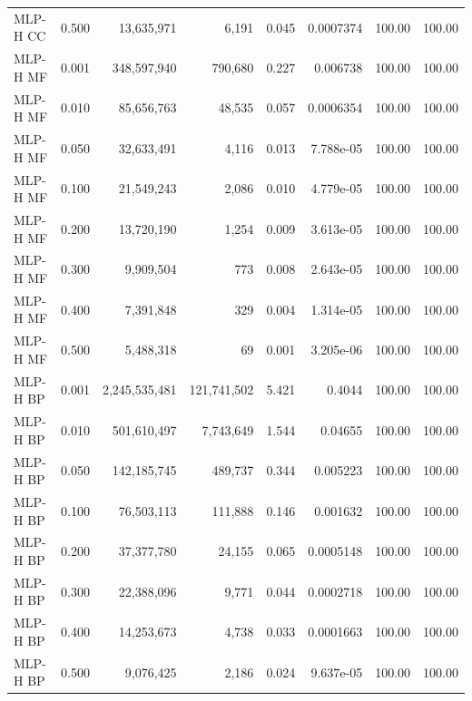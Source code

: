 \begin{longtable}{lrrrrrrr}
MLP-H CC & 0.500 & 13,635,971 & 6,191 & 0.045 & 0.0007374 & 100.00 & 100.00 \\
MLP-H MF & 0.001 & 348,597,940 & 790,680 & 0.227 & 0.006738 & 100.00 & 100.00 \\
MLP-H MF & 0.010 & 85,656,763 & 48,535 & 0.057 & 0.0006354 & 100.00 & 100.00 \\
MLP-H MF & 0.050 & 32,633,491 & 4,116 & 0.013 & 7.788e-05 & 100.00 & 100.00 \\
MLP-H MF & 0.100 & 21,549,243 & 2,086 & 0.010 & 4.779e-05 & 100.00 & 100.00 \\
MLP-H MF & 0.200 & 13,720,190 & 1,254 & 0.009 & 3.613e-05 & 100.00 & 100.00 \\
MLP-H MF & 0.300 & 9,909,504 & 773 & 0.008 & 2.643e-05 & 100.00 & 100.00 \\
MLP-H MF & 0.400 & 7,391,848 & 329 & 0.004 & 1.314e-05 & 100.00 & 100.00 \\
MLP-H MF & 0.500 & 5,488,318 & 69 & 0.001 & 3.205e-06 & 100.00 & 100.00 \\
MLP-H BP & 0.001 & 2,245,535,481 & 121,741,502 & 5.421 & 0.4044 & 100.00 & 100.00 \\
MLP-H BP & 0.010 & 501,610,497 & 7,743,649 & 1.544 & 0.04655 & 100.00 & 100.00 \\
MLP-H BP & 0.050 & 142,185,745 & 489,737 & 0.344 & 0.005223 & 100.00 & 100.00 \\
MLP-H BP & 0.100 & 76,503,113 & 111,888 & 0.146 & 0.001632 & 100.00 & 100.00 \\
MLP-H BP & 0.200 & 37,377,780 & 24,155 & 0.065 & 0.0005148 & 100.00 & 100.00 \\
MLP-H BP & 0.300 & 22,388,096 & 9,771 & 0.044 & 0.0002718 & 100.00 & 100.00 \\
MLP-H BP & 0.400 & 14,253,673 & 4,738 & 0.033 & 0.0001663 & 100.00 & 100.00 \\
MLP-H BP & 0.500 & 9,076,425 & 2,186 & 0.024 & 9.637e-05 & 100.00 & 100.00 \\
\bottomrule
\end{longtable}
\endgroup
